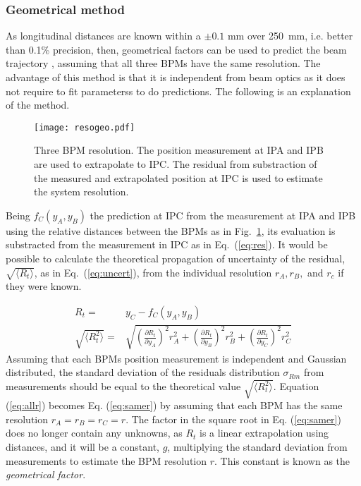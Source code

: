 \subsubsection{Geometrical method}
As longitudinal distances are known within a $\pm0.1$ mm over 250~mm, i.e. better than 0.1\% precision, then, geometrical factors can be used to predict the beam trajectory \cite{Nakamura:2008}, assuming that all three BPMs have the same resolution. The advantage of this method is that it is independent from beam optics as it does not require to fit parameterss to do predictions. The following is an explanation of the method.\par
\begin{figure}[htb]
 \centering
 \texttt{[image: resogeo.pdf]}\caption{Three BPM resolution. The position measurement at IPA and IPB are used to extrapolate to IPC. The residual from substraction of the measured and extrapolated position at IPC is used to estimate the system resolution.}\label{f:3BPMreso}
\end{figure}
Being $f_C(y_A,y_B)$ the prediction at IPC from the measurement at IPA and IPB using the relative distances between the BPMs as in Fig.~\ref{f:3BPMreso}, its evaluation is substracted from the measurement in IPC as in Eq.~(\ref{eq:res}). It would be possible to calculate the theoretical propagation of uncertainty of the residual, $\sqrt{\langle R_t\rangle}$, as in Eq.~(\ref{eq:uncert}), from the individual resolution $r_A,r_B,$ and $r_c$ if they were known.\par
 \begin{align}
 R_t=& y_C - f_C(y_A,y_B)\label{eq:res}\\
  \sqrt{\langle R_t^2\rangle} =& \sqrt{\left(\frac{\partial R_t}{\partial y_A}\right)^2r_A^2+\left(\frac{\partial R_t}{\partial y_B}\right)^2r_B^2+\left(\frac{\partial R_t}{\partial y_C}\right)^2r_C^2}\label{eq:uncert}
 \end{align}
Assuming that each BPMs position measurement is independent and Gaussian distributed, the standard deviation of the residuals distribution $\sigma_{Rm}$ from measurements should be equal to the theoretical value $\sqrt{\langle R_t^2\rangle}$. Equation (\ref{eq:allr}) becomes Eq. (\ref{eq:samer}) by assuming that each BPM has the same resolution $r_A=r_B=r_C=r$. The factor in the square root in Eq. (\ref{eq:samer}) does no longer contain any unknowns, as $R_t$ is a linear extrapolation using distances, and it will be a constant, $g$, multiplying the standard deviation from measurements to estimate the BPM resolution $r$. This constant is known as the \emph{geometrical factor}.\par
